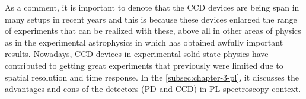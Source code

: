 
As a comment, it is important to denote that the CCD devices are being span in many setups in recent years and this is because these devices enlarged the range of experiments that can be realized with these, above all in other areas of physics as in the experimental astrophysics in which has obtained awfully important results.  Nowadays, CCD devices in experimental solid-state physics have contributed to getting great experiments that previously were limited due to spatial resolution and time response.  In the \cref{subsec:chapter-3-pl}, it discusses the advantages and cons of the detectors (PD and CCD)  in PL spectroscopy context. 


